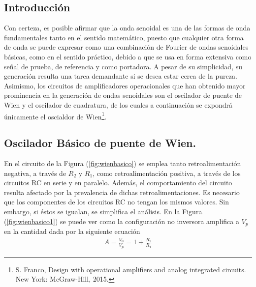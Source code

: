 \subsection{Introducción}
Con certeza, es posible afirmar que la onda senoidal es una de las formas de onda fundamentales tanto en el sentido matemático, puesto que cualquier otra forma de onda se puede expresar como una combinación de Fourier de ondas senoidales básicas, como en el
sentido práctico, debido a que se usa en forma extensiva como señal de prueba, de referencia
y como portadora. A pesar de su simplicidad, su generación resulta una tarea demandante si
se desea estar cerca de la pureza. Asimismo, los circuitos de amplificadores operacionales que han obtenido
mayor prominencia en la generación de ondas senoidales son el oscilador de puente de Wien
y el oscilador de cuadratura, de los cuales a continuación se expondrá únicamente el oscialdor de Wien\footnote{S. Franco, Design with operational amplifiers and analog integrated circuits. New York: McGraw-Hill, 2015.}.

\subsection{Oscilador Básico de puente de Wien.}
En el circuito de la Figura (\ref{fig:wienbasico}) se emplea tanto retroalimentación negativa, a través de $R_2$ y $R_1$, como retroalimentación positiva, a través de los circuitos RC en serie y en paralelo. Además, el comportamiento del circuito resulta afectado por la prevalencia de dichas retroalimentaciones. Es necesario que los componentes de los circuitos RC no tengan los mismos valores. Sin embargo, si éstos se igualan, se simplifica el análisis. En la Figura (\ref{fig:wienbasico1}) se puede ver como la configuración no inversora amplifica a $V_p$ en la cantidad dada por la siguiente ecuación
\begin{align}
	A=\frac{V_0}{V_p}=1+\frac{R_2}{R_1}
\end{align}

